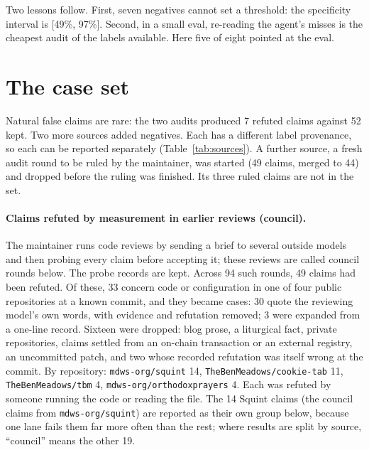 \documentclass[11pt]{article}
\begin{document}
Two lessons follow. First, seven negatives cannot set a threshold: the specificity interval is [49\%, 97\%]. Second, in a small eval, re-reading the agent's misses is the cheapest audit of the labels available. Here five of eight pointed at the eval.

\section{The case set}
\label{sec:cases}

Natural false claims are rare: the two audits produced 7 refuted claims against 52 kept. Two more sources added negatives. Each has a different label provenance, so each can be reported separately (Table~\ref{tab:sources}). A further source, a fresh audit round to be ruled by the maintainer, was started (49 claims, merged to 44) and dropped before the ruling was finished. Its three ruled claims are not in the set.

\paragraph{Claims refuted by measurement in earlier reviews (council).} The maintainer runs code reviews by sending a brief to several outside models and then probing every claim before accepting it; these reviews are called council rounds below. The probe records are kept. Across 94 such rounds, 49 claims had been refuted. Of these, 33 concern code or configuration in one of four public repositories at a known commit, and they became cases: 30 quote the reviewing model's own words, with evidence and refutation removed; 3 were expanded from a one-line record. Sixteen were dropped: blog prose, a liturgical fact, private repositories, claims settled from an on-chain transaction or an external registry, an uncommitted patch, and two whose recorded refutation was itself wrong at the commit. By repository: \texttt{mdws-org/squint} 14, \texttt{TheBenMeadows/cookie-tab} 11, \texttt{TheBenMeadows/tbm} 4, \texttt{mdws-org/orthodoxprayers} 4. Each was refuted by someone running the code or reading the file. The 14 Squint claims (the council claims from \texttt{mdws-org/squint}) are reported as their own group below, because one lane fails them far more often than the rest; where results are split by source, ``council'' means the other 19.
\end{document}
